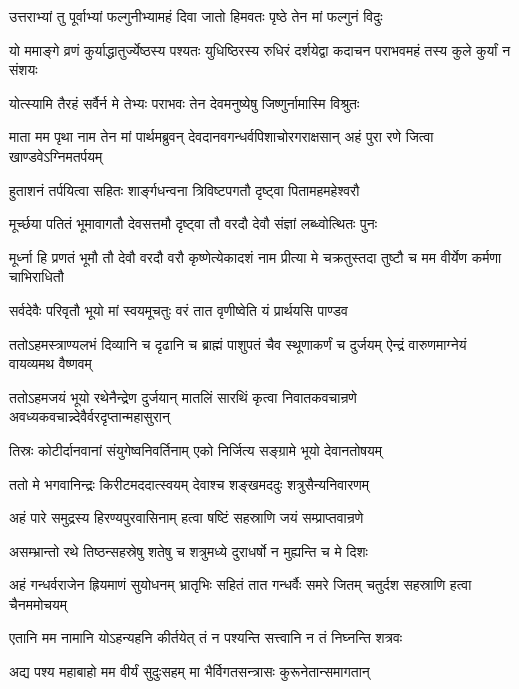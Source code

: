 \twolineshloka
{उत्तराभ्यां तु पूर्वाभ्यां फल्गुनीभ्यामहं दिवा}
{जातो हिमवतः पृष्ठे तेन मां फल्गुनं विदुः}


\threelineshloka
{यो ममाङ्गे व्रणं कुर्याद्धातुर्ज्येष्ठस्य पश्यतः}
{युधिष्ठिरस्य रुधिरं दर्शयेद्वा कदाचन}
{पराभवमहं तस्य कुले कुर्यां न संशयः}


\twolineshloka
{योत्स्यामि तैरहं सर्वैर्न मे तेभ्यः पराभवः}
{तेन देवमनुष्येषु जिष्णुर्नामास्मि विश्रुतः}


\onelineshloka
{माता मम पृथा नाम तेन मां पार्थमब्रुवन्}
\twolineshloka
{देवदानवगन्धर्वपिशाचोरगराक्षसान्}
{अहं पुरा रणे जित्वा खाण्डवेऽग्निमतर्पयम्}


\twolineshloka
{हुताशनं तर्पयित्वा सहितः शार्ङ्गधन्वना}
{त्रिविष्टपगतौ दृष्ट्वा पितामहमहेश्वरौ}


\twolineshloka
{मूर्च्छया पतितं भूमावागतौ देवसत्तमौ}
{दृष्ट्वा तौ वरदौ देवौ संज्ञां लब्ध्वोत्थितः पुनः}


\threelineshloka
{मूर्ध्ना हि प्रणतं भूमौ तौ देवौ वरदौ वरौ}
{कृष्णेत्येकादशं नाम प्रीत्या मे चक्रतुस्तदा}
{तुष्टौ च मम वीर्येण कर्मणा चाभिराधितौ}


\twolineshloka
{सर्वदेवैः परिवृतौ भूयो मां स्वयमूचतुः}
{वरं तात वृणीष्वेति यं प्रार्थयसि पाण्डव}


\threelineshloka
{ततोऽहमस्त्राण्यलभं दिव्यानि च दृढानि च}
{ब्राह्मं पाशुपतं चैव स्थूणाकर्णं च दुर्जयम्}
{ऐन्द्रं वारुणमाग्नेयं वायव्यमथ वैष्णवम्}


\threelineshloka
{ततोऽहमजयं भूयो रथेनैन्द्रेण दुर्जयान्}
{मातलिं सारथिं कृत्वा निवातकवचान्रणे}
{अवध्यकवचान्न्देवैर्वरदृप्तान्महासुरान्}


\twolineshloka
{तिस्रः कोटीर्दानवानां संयुगेष्वनिवर्तिनाम्}
{एको निर्जित्य सङ्ग्रामे भूयो देवानतोषयम्}


\twolineshloka
{ततो मे भगवानिन्द्रः किरीटमददात्स्वयम्}
{देवाश्च शङ्खमददुः शत्रुसैन्यनिवारणम्}


\twolineshloka
{अहं पारे समुद्रस्य हिरण्यपुरवासिनाम्}
{हत्वा षष्टिं सहस्राणि जयं सम्प्राप्तवान्रणे}


\twolineshloka
{असम्भ्रान्तो रथे तिष्ठन्सहस्रेषु शतेषु च}
{शत्रुमध्ये दुराधर्षो न मुह्यन्ति च मे दिशः}


\threelineshloka
{अहं गन्धर्वराजेन ह्रियमाणं सुयोधनम्}
{भ्रातृभिः सहितं तात गन्धर्वैः समरे जितम्}
{चतुर्दश सहस्राणि हत्वा चैनममोचयम्}


\twolineshloka
{एतानि मम नामानि योऽहन्यहनि कीर्तयेत्}
{तं न पश्यन्ति सत्त्वानि न तं निघ्नन्ति शत्रवः}


\twolineshloka
{अद्य पश्य महाबाहो मम वीर्यं सुदुःसहम्}
{मा भैर्विगतसन्त्रासः कुरूनेतान्समागतान्}


